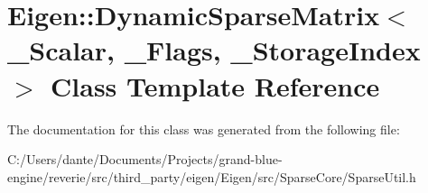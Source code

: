 \hypertarget{class_eigen_1_1_dynamic_sparse_matrix}{}\section{Eigen\+::Dynamic\+Sparse\+Matrix$<$ \+\_\+\+Scalar, \+\_\+\+Flags, \+\_\+\+Storage\+Index $>$ Class Template Reference}
\label{class_eigen_1_1_dynamic_sparse_matrix}


The documentation for this class was generated from the following file\+:\begin{DoxyCompactItemize}
\item 
C\+:/\+Users/dante/\+Documents/\+Projects/grand-\/blue-\/engine/reverie/src/third\+\_\+party/eigen/\+Eigen/src/\+Sparse\+Core/Sparse\+Util.\+h\end{DoxyCompactItemize}
